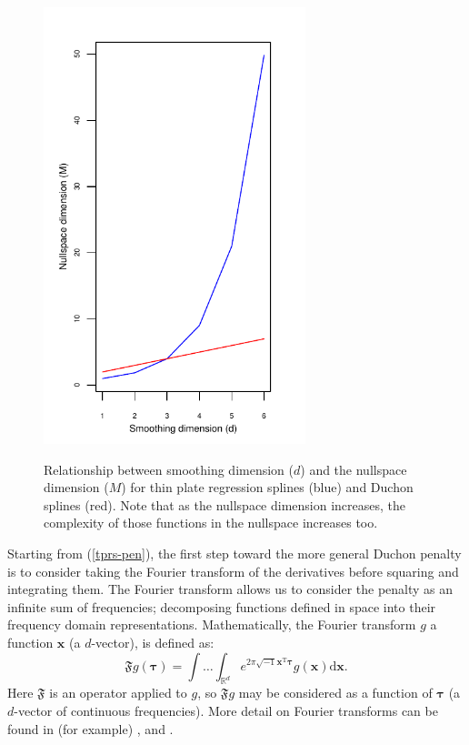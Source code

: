 \begin{figure}
\centering
\includegraphics[width=3in]{gds/figs/nullspace-dim.pdf} \\
\caption{Relationship between smoothing dimension ($d$) and the nullspace dimension ($M$) for thin plate regression splines (blue) and Duchon splines (red). Note that as the nullspace dimension increases, the complexity of those functions in the nullspace increases too.}
\label{nullspace-dim}
\end{figure}

Starting from (\ref{tprs-pen}), the first step toward the more general Duchon penalty is to consider taking the Fourier transform of the derivatives before squaring and integrating them. The Fourier transform allows us to consider the penalty as an infinite sum of frequencies; decomposing functions defined in space into their frequency domain representations. Mathematically, the Fourier transform $g$ a function $\mathbf{x}$ (a $d$-vector), is defined as:
\begin{equation*}
\mathfrak{F} g(\boldsymbol{\tau}) = \int \ldots \int_{\mathbb{R}^d} e^{2 \pi \sqrt{-1} \mathbf{x}^\text{T} \boldsymbol{\tau}} g(\mathbf{x}) \text{d}\mathbf{x}.
\end{equation*}
Here $\mathfrak{F}$ is an operator applied to $g$, so $\mathfrak{F}g$ may be considered as a function of $\boldsymbol{\tau}$ (a $d$-vector of continuous frequencies). More detail on Fourier transforms can be found in (for example) \cite{bracewell}, \cite{chu-ft} and \cite{beerends}. 

